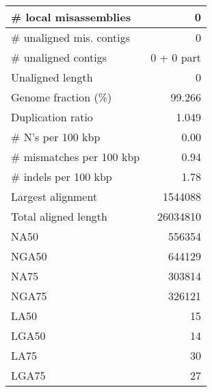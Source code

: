 \documentclass[12pt,a4paper]{article}
\begin{document}
\begin{table}[ht]
\begin{center}
\begin{tabular}{|l*{1}{|r}|}
\# local misassemblies & 0 \\ \hline
\# unaligned mis. contigs & 0 \\ \hline
\# unaligned contigs & 0 + 0 part \\ \hline
Unaligned length & 0 \\ \hline
Genome fraction (\%) & 99.266 \\ \hline
Duplication ratio & 1.049 \\ \hline
\# N's per 100 kbp & 0.00 \\ \hline
\# mismatches per 100 kbp & 0.94 \\ \hline
\# indels per 100 kbp & 1.78 \\ \hline
Largest alignment & 1544088 \\ \hline
Total aligned length & 26034810 \\ \hline
NA50 & 556354 \\ \hline
NGA50 & 644129 \\ \hline
NA75 & 303814 \\ \hline
NGA75 & 326121 \\ \hline
LA50 & 15 \\ \hline
LGA50 & 14 \\ \hline
LA75 & 30 \\ \hline
LGA75 & 27 \\ \hline
\end{tabular}
\end{center}
\end{table}
\end{document}
